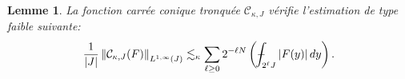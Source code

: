 \documentclass[11pt]{amsart}
\newtheorem{lemma}[theorem]{Lemme}
\DeclareMathOperator{\dive}{div}
\def\Xint#1{\mathchoice
   {\XXint\displaystyle\textstyle{#1}}%
   {\XXint\textstyle\scriptstyle{#1}}%
   {\XXint\scriptstyle\scriptscriptstyle{#1}}%
   {\XXint\scriptscriptstyle\scriptscriptstyle{#1}}%
   \!\int}
\def\XXint#1#2#3{{\setbox0=\hbox{$#1{#2#3}{\int}$}
     \vcenter{\hbox{$#2#3$}}\kern-.5\wd0}}
\def\aver#1{\Xint-_{#1}}
\begin{document}
%

\begin{lemma}\label{Lemme:fonctioncarre}  La fonction carr\'ee conique tronqu\'ee ${\mathcal C}_{\kappa,J}$ v\'erifie l'estimation de type faible suivante:
$$  \frac{1}{|J|}\left\| {\mathcal C}_{\kappa,J}(F)\right\|_{L^{1,\infty}(J)} \lesssim_\kappa \sum_{\ell \geq 0} 2^{-\ell N} \left(\aver{2^\ell J} |F(y)| \, dy \right).$$
\end{lemma}
\end{document}
